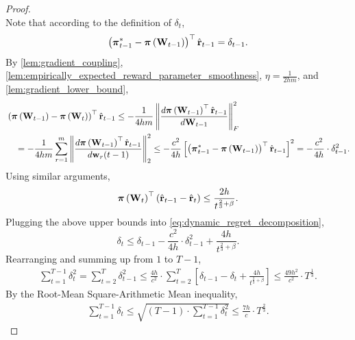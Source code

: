 \begin{proof}
\begin{equation*}
\end{equation*}
Note that according to the definition of $\delta_t$,
\begin{equation*}
    \left( {{\boldsymbol{\pi}}_{t-1}^*} - {\boldsymbol{\pi}}\left( {\mathbf{W}}_{t-1} \right) \right)^\top \hat{{\mathbf{r}}}_{t-1} = \delta_{t-1}.
\end{equation*}
By \cref{lem:gradient_coupling}, \cref{lem:empirically_expected_reward_parameter_smoothness}, $\eta = \frac{1}{2 h m}$, and \cref{lem:gradient_lower_bound},
\begin{equation*}
\begin{split}
    &\left( {\boldsymbol{\pi}}\left( {\mathbf{W}}_{t-1} \right) - {\boldsymbol{\pi}}\left( {\mathbf{W}}_t \right) \right)^\top \hat{{\mathbf{r}}}_{t-1} \le - \frac{1}{4 h m} \left\| \frac{d {\boldsymbol{\pi}}\left( {\mathbf{W}}_{t-1} \right)^\top \hat{{\mathbf{r}}}_{t-1}}{d {\mathbf{W}}_{t-1}} \right\|_F^2 \\
    &\quad = - \frac{1}{4 h m} \sum\limits_{r=1}^{m}{ \left\| \frac{d {\boldsymbol{\pi}}\left( {\mathbf{W}}_{t-1} \right)^\top \hat{{\mathbf{r}}}_{t-1}}{d {\mathbf{w}}_r(t-1)} \right\|_2^2 } \le - \frac{c^2}{4 h} \left[ \left( {{\boldsymbol{\pi}}_{t-1}^*} - {\boldsymbol{\pi}}\left( {\mathbf{W}}_{t-1} \right) \right)^\top \hat{{\mathbf{r}}}_{t-1}  \right]^2 = - \frac{c^2}{4 h} \cdot \delta_{t-1}^2.
\end{split}
\end{equation*}
Using similar arguments,
\begin{equation*}
    {\boldsymbol{\pi}}\left( {\mathbf{W}}_t \right)^\top \left( \hat{{\mathbf{r}}}_{t-1} - \hat{{\mathbf{r}}}_t  \right) \le \frac{ 2 h }{t^{\frac{2}{3} + \beta}}.
\end{equation*}
Plugging the above upper bounds into \cref{eq:dynamic_regret_decomposition},
\begin{equation*}
    \delta_t \le \delta_{t-1} - \frac{c^2}{4 h} \cdot \delta_{t-1}^2 + \frac{ 4 h }{t^{\frac{2}{3} + \beta}}.
\end{equation*}
Rearranging and summing up from $1$ to $T-1$,
\begin{equation*}
\begin{split}
    \sum\limits_{t=1}^{T-1}{\delta_{t}^2} = \sum\limits_{t=2}^{T}{\delta_{t-1}^2} \le \frac{4 h}{ c^2} \cdot  \sum\limits_{t=2}^{T} { \left[ \delta_{t-1} - \delta_t + \frac{ 4 h }{t^{\frac{2}{3} + \beta}} \right] } \le \frac{49 h^2}{ c^2} \cdot T^{\frac{1}{3}}.
\end{split}
\end{equation*}
By the Root-Mean Square-Arithmetic Mean inequality,
\begin{equation*}
\begin{split}
    \sum\limits_{t=1}^{T-1}{\delta_{t}} \le \sqrt{\left(T  - 1 \right) \cdot \sum\limits_{t=1}^{T-1}{\delta_{t}^2}} \le \frac{7 h}{c} \cdot  T^{\frac{2}{3}}.

\end{split}
\end{equation*}
\end{proof}
